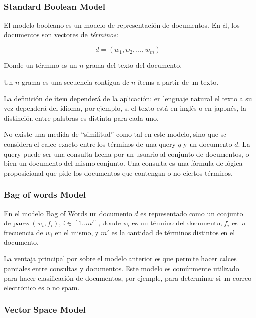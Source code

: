     \subsubsection{Standard Boolean Model}

    El modelo booleano es un modelo de representación de
    documentos. En él, los documentos son vectores de \emph{términos}:

    $$d = (w_1,w_2,\ldots,w_m)$$

    Donde un término es un $n$-grama del texto del documento.

    \begin{defn} Un $n$-grama es una secuencia contigua de $n$ ítems a
    partir de un texto. \end{defn}

    La definición de ítem dependerá de la aplicación: en lenguaje
    natural el texto a su vez dependerá del idioma, por ejemplo, si el
    texto está en inglés o en japonés, la distinción entre palabras
    es distinta para cada uno.

    No existe una medida de ``similitud'' como tal en este modelo, sino
    que se considera el calce exacto entre los términos de una query
    $q$ y un documento $d$. La query puede ser una consulta hecha por
    un usuario al conjunto de documentos, o bien un documento del
    mismo conjunto. Una consulta es una fórmula de lógica proposicional que pide los
    documentos que contengan o no ciertos términos.

    \subsubsection{Bag of words Model}

    En el modelo Bag of Words un documento $d$ es representado como un
    conjunto de pares $(w_i, f_i)$, $i\in[1..m']$, donde $w_i$ es un
    término del documento, $f_i$ es la frecuencia de $w_i$ en el
    mismo, y $m'$ es la cantidad de términos distintos en el
    documento.

    La ventaja principal por sobre el modelo anterior es que permite
    hacer calces parciales entre consultas y documentos. Este modelo
    es comúnmente utilizado para hacer clasificación de documentos,
    por ejemplo, para determinar si un correo electrónico es o no
    spam.

    \subsubsection{Vector Space Model}

